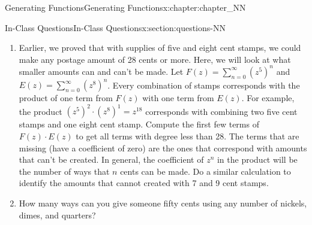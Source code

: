 \documentclass[oneside,10pt,]{book}
\numberwithin{equation}{section}
\begin{document}
\begin{chapterptx}{Generating Functions}{}{Generating Functions}{}{}{x:chapter:chapter_NN}
\begin{sectionptx}{In-Class Questions}{}{In-Class Questions}{}{}{x:section:questions-NN}
\begin{enumerate}[label=\arabic*.]
What sequence has as its generating function \(G(d;z)^2\)?  How is that sequence related to what you get when you roll two dice and add the top faces?%
\item{}Earlier, we proved that with supplies of five and eight cent stamps, we could make any postage amount of 28 cents or more.  Here, we will look at what smaller amounts can and can't be made.  Let \(F(z)= \sum_{n=0}^{\infty} (z^{5})^n\) and \(E(z)=\sum_{n=0}^{\infty} (z^{8})^n\).  Every combination of stamps corresponds with the product of one term from \(F(z)\) with one term from \(E(z)\).  For example, the product \((z^{5})^{2}\cdot (z^{8})^1= z^{18}\)  corresponds with combining two five cent stamps and one eight cent stamp.  Compute the first few terms of \(F(z)\cdot E(z)\) to  get all terms with degree less than 28. The terms that are missing (have a coefficient of zero) are the ones that correspond with amounts that can't be created.  In general, the coefficient of \(z^n\) in the product will be the number of ways that \(n\) cents can be made. Do a similar calculation to identify the amounts that cannot created with 7 and 9 cent stamps.%
\item{}How many ways can you give someone fifty cents using any number of nickels, dimes, and quarters?%
\end{enumerate}
%
\end{sectionptx}
\end{chapterptx}
%
\backmatter
%
%
%
%
%
\typeout{************************************************}
\typeout{************************************************}
%
\end{document}
